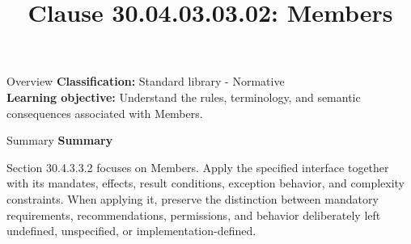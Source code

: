 \documentclass[10pt,letterpaper]{article}
\title{Clause 30.04.03.03.02: Members}
\author{}
\date{}
\begin{document}
\maketitle
\begin{CornellOverviewBox}{Overview}
\textbf{Classification:} Standard library - Normative\\[2pt]
\textbf{Learning objective:} Understand the rules, terminology, and semantic consequences associated with Members.
\end{CornellOverviewBox}\begin{CornellSummaryBox}{Summary}
{\sffamily\bfseries\color{Accent} Summary}\par\vspace{3pt}Section 30.4.3.3.2 focuses on Members. Apply the specified interface together with its mandates, effects, result conditions, exception behavior, and complexity constraints. When applying it, preserve the distinction between mandatory requirements, recommendations, permissions, and behavior deliberately left undefined, unspecified, or implementation-defined.
\end{CornellSummaryBox}
\end{document}

